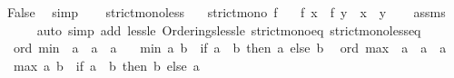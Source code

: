 \begin{isabellebody}
\ False\ \isamarkupfalse%
\ simp\isanewline
\ \ \isamarkupfalse%
\isanewline
{}\isamarkupfalse%
%
\endisatagproof
{\isafoldproof}%
%
\isadelimproof
\isanewline
%
\endisadelimproof
\isanewline
{}\isamarkupfalse%
\ strict{\isacharunderscore}{\kern0pt}mono{\isacharunderscore}{\kern0pt}less{\isacharcolon}{\kern0pt}\isanewline
\ \ \ {\isachardoublequoteopen}strict{\isacharunderscore}{\kern0pt}mono\ f{\isachardoublequoteclose}\isanewline
\ \ \ {\isachardoublequoteopen}f\ x\ {\isacharless}{\kern0pt}\ f\ y\ {\isasymlongleftrightarrow}\ x\ {\isacharless}{\kern0pt}\ y{\isachardoublequoteclose}\isanewline
%
\isadelimproof
\ \ %
\endisadelimproof
%
\isatagproof
{}\isamarkupfalse%
\ assms\isanewline
\ \ \ \ \isamarkupfalse%
\ {\isacharparenleft}{\kern0pt}auto\ simp\ add{\isacharcolon}{\kern0pt}\ less{\isacharunderscore}{\kern0pt}le\ Orderings{\isachardot}{\kern0pt}less{\isacharunderscore}{\kern0pt}le\ strict{\isacharunderscore}{\kern0pt}mono{\isacharunderscore}{\kern0pt}eq\ strict{\isacharunderscore}{\kern0pt}mono{\isacharunderscore}{\kern0pt}less{\isacharunderscore}{\kern0pt}eq{\isacharparenright}{\kern0pt}%
\endisatagproof
{\isafoldproof}%
%
\isadelimproof
\isanewline
%
\endisadelimproof
\isanewline
{}\isamarkupfalse%
%
\isadelimdocument
%
\endisadelimdocument
%
\isatagdocument
%
\isamarkuptrue%
%
\endisatagdocument
{\isafolddocument}%
%
\isadelimdocument
%
\endisadelimdocument
{}\isamarkupfalse%
\ {\isacharparenleft}{\kern0pt}\ ord{\isacharparenright}{\kern0pt}\ min\ {\isacharcolon}{\kern0pt}{\isacharcolon}{\kern0pt}\ {\isachardoublequoteopen}{\isacharprime}{\kern0pt}a\ {\isasymRightarrow}\ {\isacharprime}{\kern0pt}a\ {\isasymRightarrow}\ {\isacharprime}{\kern0pt}a{\isachardoublequoteclose}\ \isanewline
\ \ {\isachardoublequoteopen}min\ a\ b\ {\isacharequal}{\kern0pt}\ {\isacharparenleft}{\kern0pt}if\ a\ {\isasymle}\ b\ then\ a\ else\ b{\isacharparenright}{\kern0pt}{\isachardoublequoteclose}\isanewline
\isanewline
{}\isamarkupfalse%
\ {\isacharparenleft}{\kern0pt}\ ord{\isacharparenright}{\kern0pt}\ max\ {\isacharcolon}{\kern0pt}{\isacharcolon}{\kern0pt}\ {\isachardoublequoteopen}{\isacharprime}{\kern0pt}a\ {\isasymRightarrow}\ {\isacharprime}{\kern0pt}a\ {\isasymRightarrow}\ {\isacharprime}{\kern0pt}a{\isachardoublequoteclose}\ \isanewline
\ \ {\isachardoublequoteopen}max\ a\ b\ {\isacharequal}{\kern0pt}\ {\isacharparenleft}{\kern0pt}if\ a\ {\isasymle}\ b\ then\ b\ else\ a{\isacharparenright}{\kern0pt}{\isachardoublequoteclose}\isanewline

\end{isabellebody}
